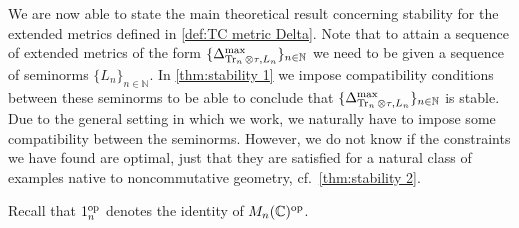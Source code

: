 \documentclass[11pt, a4paper, oneside, final, reqno]{amsart}
\newcommand{\bbN}{\mathbb{N}}
\newcommand{\bbC}{\mathbb{C}}
\newcommand{\Tr}{\operatorname{Tr}}
\theoremstyle{definition}
\theoremstyle{plain}
\theoremstyle{remark}
\numberwithin{equation}{section}
\begin{document}
We are now able to state the main theoretical result concerning stability for the extended metrics defined in \cref{def:TC metric Delta}. Note that to attain a sequence of extended metrics of the form $\{\Delta_{\Tr_n \otimes \tau, L_n}^{\rm max}\}_{n \in \bbN}$ we need to be given a sequence of seminorms $\{L_n\}_{n \in \bbN}$. In \cref{thm:stability 1} we impose  compatibility conditions between these seminorms to be able to conclude that $\{\Delta_{\Tr_n \otimes \tau, L_n}^{\rm max}\}_{n \in \bbN}$ is stable. Due to the general setting in which we work, we naturally have to impose some compatibility between the seminorms. However, we do not know if the constraints we have found are optimal, just that they are satisfied for a natural class of examples 
native to 
noncommutative geometry, cf.~\cref{thm:stability 2}.

Recall that $1_n^{\rm op}$ denotes the identity of $M_n(\bbC)^{\rm op}$.
\end{document}

